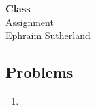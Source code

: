 



\begin{center}
{\large \bf Class }   \\ \large Assignment \\ Ephraim Sutherland
\end{center}

\subsection*{Problems}

\begin{enumerate}

\item 
\end{enumerate} 



